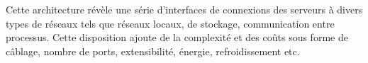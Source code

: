 

Cette architecture révèle une série d'interfaces de connexions des serveurs à divers types de réseaux tels que réseaux locaux, de stockage, communication entre processus. Cette disposition ajoute de la complexité et des coûts sous forme de câblage, nombre de ports, extensibilité, énergie, refroidissement etc. 

